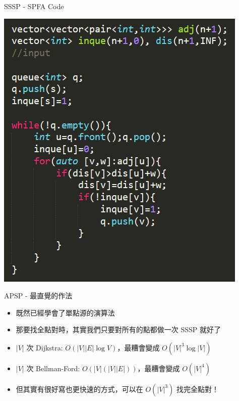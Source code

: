 \documentclass[aspectratio=169]{beamer}
\begin{document}
    \begin{frame}{SSSP - SPFA Code}
        \begin{center}
            \includegraphics[scale=0.6]{code/SPFA_code.png}
        \end{center}
    \end{frame}
    
    \begin{frame}{APSP - 最直覺的作法}
        \begin{itemize}
            \item 既然已經學會了單點源的演算法
            \item 那要找全點對時，其實我們只要對所有的點都做一次 SSSP 就好了
            \item $|V|$ 次 Dijkstra: $O(|V||E| \log V)$，最糟會變成 $O(|V|^3 \log |V|)$
            \item $|V|$ 次 Bellman-Ford: $O(|V|(|V||E|))$，最糟會變成 $O(|V|^4)$
            \item 但其實有很好寫也更快速的方式，可以在 $O(|V|^3)$ 找完全點對！
        \end{itemize}
    \end{frame}
    
\end{document}
